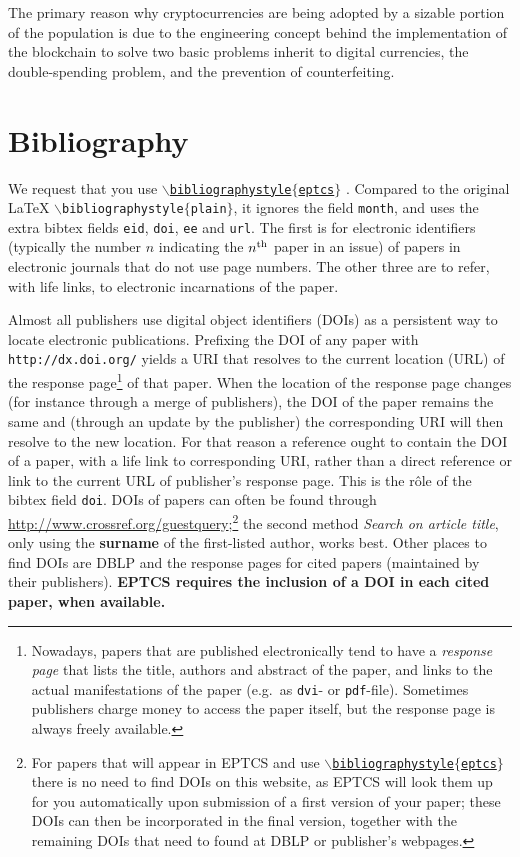 \documentclass[submission,copyright,creativecommons]{eptcs}
\begin{document}
The primary reason why cryptocurrencies are being adopted by a sizable portion of the population is due to the engineering concept behind the implementation of the blockchain to solve two basic problems inherit to digital currencies, the double-spending problem, and the prevention of counterfeiting.

\section{Bibliography}

We request that you use
\href{http://www.cse.unsw.edu.au/~rvg/EPTCS/eptcs.bst}
{\tt $\backslash$bibliographystyle$\{$eptcs$\}$}
\cite{vidal_tokenizing_2017}. Compared to the original {\LaTeX}
{\tt $\backslash$biblio\-graphystyle$\{$plain$\}$},
it ignores the field {\tt month}, and uses the extra
bibtex fields {\tt eid}, {\tt doi}, {\tt ee} and {\tt url}.
The first is for electronic identifiers (typically the number $n$
indicating the $n^{\rm th}$ paper in an issue) of papers in electronic
journals that do not use page numbers. The other three are to refer,
with life links, to electronic incarnations of the paper.

Almost all publishers use digital object identifiers (DOIs) as a
persistent way to locate electronic publications. Prefixing the DOI of
any paper with {\tt http://dx.doi.org/} yields a URI that resolves to the
current location (URL) of the response page\footnote{Nowadays, papers
  that are published electronically tend
  to have a \emph{response page} that lists the title, authors and
  abstract of the paper, and links to the actual manifestations of
  the paper (e.g.\ as {\tt dvi}- or {\tt pdf}-file). Sometimes
  publishers charge money to access the paper itself, but the response
  page is always freely available.}
of that paper. When the location of the response page changes (for
instance through a merge of publishers), the DOI of the paper remains
the same and (through an update by the publisher) the corresponding
URI will then resolve to the new location. For that reason a reference
ought to contain the DOI of a paper, with a life link to corresponding
URI, rather than a direct reference or link to the current URL of
publisher's response page. This is the r\^ole of the bibtex field {\tt doi}.
DOIs of papers can often be found through
\url{http://www.crossref.org/guestquery};\footnote{For papers that will appear
  in EPTCS and use \href{http://www.cse.unsw.edu.au/~rvg/EPTCS/eptcs.bst}
  {\tt $\backslash$bibliographystyle$\{$eptcs$\}$} there is no need to
  find DOIs on this website, as EPTCS will look them up for you
  automatically upon submission of a first version of your paper;
  these DOIs can then be incorporated in the final version, together
  with the remaining DOIs that need to found at DBLP or publisher's webpages.}
the second method {\it Search on article title}, only using the {\bf
surname} of the first-listed author, works best.  
Other places to find DOIs are DBLP and the response pages for cited
papers (maintained by their publishers).
{\bf EPTCS requires the inclusion of a DOI in each cited paper, when available.}
\end{document}
